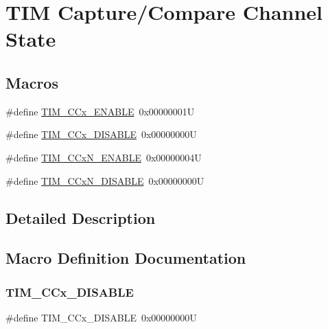 \hypertarget{group___channel___c_c___state}{}\section{T\+IM Capture/\+Compare Channel State}
\label{group___channel___c_c___state}
\subsection*{Macros}
\begin{DoxyCompactItemize}
\item 
\#define \mbox{\hyperlink{group___channel___c_c___state_ga7b214df0d5c67138de7bc84e937909f0}{T\+I\+M\+\_\+\+C\+Cx\+\_\+\+E\+N\+A\+B\+LE}}~0x00000001U
\item 
\#define \mbox{\hyperlink{group___channel___c_c___state_ga5068d16e01778cd3bd09555013b2f4d3}{T\+I\+M\+\_\+\+C\+Cx\+\_\+\+D\+I\+S\+A\+B\+LE}}~0x00000000U
\item 
\#define \mbox{\hyperlink{group___channel___c_c___state_ga69ecb0bf5dcd5ecf30af36d6fc00ea0d}{T\+I\+M\+\_\+\+C\+Cx\+N\+\_\+\+E\+N\+A\+B\+LE}}~0x00000004U
\item 
\#define \mbox{\hyperlink{group___channel___c_c___state_ga241183326d83407f7cc7dbd292533240}{T\+I\+M\+\_\+\+C\+Cx\+N\+\_\+\+D\+I\+S\+A\+B\+LE}}~0x00000000U
\end{DoxyCompactItemize}


\subsection{Detailed Description}


\subsection{Macro Definition Documentation}
\mbox{\label{group___channel___c_c___state_ga5068d16e01778cd3bd09555013b2f4d3}} 
\subsubsection{\texorpdfstring{TIM\_CCx\_DISABLE}{TIM\_CCx\_DISABLE}}
{\footnotesize\ttfamily \#define T\+I\+M\+\_\+\+C\+Cx\+\_\+\+D\+I\+S\+A\+B\+LE~0x00000000U}

